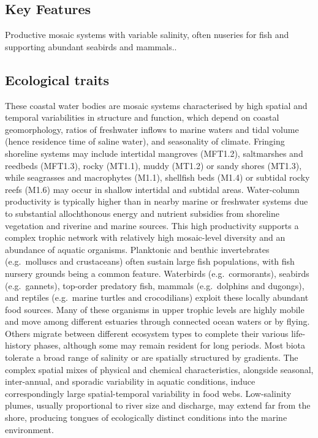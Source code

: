 \documentclass[
  letterpaper,
  DIV=11,
  numbers=noendperiod]{scrartcl}
\begin{document}
\subsection{Key Features}\label{key-features-23}

Productive mosaic systems with variable salinity, often nuseries for
fish and supporting abundant seabirds and mammals..

\subsection{Ecological traits}\label{ecological-traits-23}

These coastal water bodies are mosaic systems characterised by high
spatial and temporal variabilities in structure and function, which
depend on coastal geomorphology, ratios of freshwater inflows to marine
waters and tidal volume (hence residence time of saline water), and
seasonality of climate. Fringing shoreline systems may include
intertidal mangroves (MFT1.2), saltmarshes and reedbeds (MFT1.3), rocky
(MT1.1), muddy (MT1.2) or sandy shores (MT1.3), while seagrasses and
macrophytes (M1.1), shellfish beds (M1.4) or subtidal rocky reefs (M1.6)
may occur in shallow intertidal and subtidal areas. Water-column
productivity is typically higher than in nearby marine or freshwater
systems due to substantial allochthonous energy and nutrient subsidies
from shoreline vegetation and riverine and marine sources. This high
productivity supports a complex trophic network with relatively high
mosaic-level diversity and an abundance of aquatic organisms. Planktonic
and benthic invertebrates (e.g.~molluscs and crustaceans) often sustain
large fish populations, with fish nursery grounds being a common
feature. Waterbirds (e.g.~cormorants), seabirds (e.g.~gannets),
top-order predatory fish, mammals (e.g.~dolphins and dugongs), and
reptiles (e.g.~marine turtles and crocodilians) exploit these locally
abundant food sources. Many of these organisms in upper trophic levels
are highly mobile and move among different estuaries through connected
ocean waters or by flying. Others migrate between different ecosystem
types to complete their various life-history phases, although some may
remain resident for long periods. Most biota tolerate a broad range of
salinity or are spatially structured by gradients. The complex spatial
mixes of physical and chemical characteristics, alongside seasonal,
inter-annual, and sporadic variability in aquatic conditions, induce
correspondingly large spatial-temporal variability in food webs.
Low-salinity plumes, usually proportional to river size and discharge,
may extend far from the shore, producing tongues of ecologically
distinct conditions into the marine environment.
\end{document}
